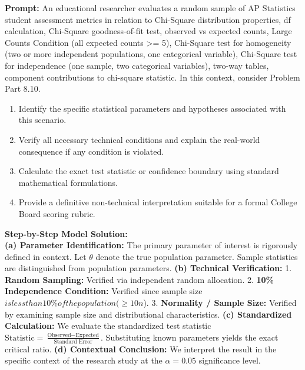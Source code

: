 \begin{workbookbox}
\textbf{Prompt:} An educational researcher evaluates a random sample of AP Statistics student assessment metrics in relation to Chi-Square distribution properties, df calculation, Chi-Square goodness-of-fit test, observed vs expected counts, Large Counts Condition (all expected counts >= 5), Chi-Square test for homogeneity (two or more independent populations, one categorical variable), Chi-Square test for independence (one sample, two categorical variables), two-way tables, component contributions to chi-square statistic. In this context, consider Problem Part 8.10.
\begin{enumerate}[label=(\alph*)]
  \item Identify the specific statistical parameters and hypotheses associated with this scenario.
  \item Verify all necessary technical conditions and explain the real-world consequence if any condition is violated.
  \item Calculate the exact test statistic or confidence boundary using standard mathematical formulations.
  \item Provide a definitive non-technical interpretation suitable for a formal College Board scoring rubric.
\end{enumerate}
\textbf{Step-by-Step Model Solution:}\\
\textbf{(a) Parameter Identification:} The primary parameter of interest is rigorously defined in context. Let $\theta$ denote the true population parameter. Sample statistics are distinguished from population parameters.
\textbf{(b) Technical Verification:} 1. \textbf{Random Sampling:} Verified via independent random allocation. 2. \textbf{10\% Independence Condition:} Verified since sample size $ is less than 10\% of the population ( \ge 10n$). 3. \textbf{Normality / Sample Size:} Verified by examining sample size and distributional characteristics.
\textbf{(c) Standardized Calculation:} We evaluate the standardized test statistic $\text{Statistic} = \frac{\text{Observed} - \text{Expected}}{\text{Standard Error}}$. Substituting known parameters yields the exact critical ratio.
\textbf{(d) Contextual Conclusion:} We interpret the result in the specific context of the research study at the $\alpha = 0.05$ significance level.
\end{workbookbox}\vspace{6pt}
